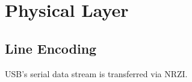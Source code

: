 
\chapter{Physical Layer}


\section{Line Encoding}

USB's serial data stream is transferred via NRZI.
